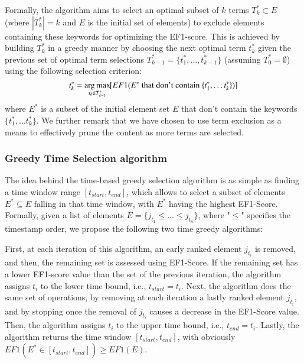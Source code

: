 Formally, the algorithm aims to select an
optimal subset of $k$ terms $T_{k}^{*}\subset E$ (where $|T_{k}^{*}|=k$ and $E$ is the initial set of elements) to exclude elements containing these keywords for optimizing the EF1-score. This is achieved by
building $T_{k}^{*}$ in a greedy manner by choosing the next optimal
term $t_{k}^{*}$ given the previous set of optimal term selections
$T_{k-1}^{*}=\{t_{1}^{*},\ldots,t_{k-1}^{*}\}$ (assuming $T_{0}^{*}=\emptyset$)
using the following selection criterion:
\begin{equation}
t_{k}^{*}=\operatorname*{arg\,max}_{t_{k}\notin T_{k-1}^{*}}\hspace{-0.3mm}[EF1(E^{*} \textrm{ that don't contain } \{t_{1}^{*},\dots t_{k}^{*}\})]
\end{equation}
where  $E^{*}$ is a subset of the initial element set $E$ that don't contain the keywords $\{t_{1}^{*},\dots t_{k}^{*}\}$. 
We further remark that we have chosen to use term exclusion as a means to effectively prune the content as more terms are selected.  

\subsubsection{Greedy Time Selection algorithm}

The idea behind the time-based greedy selection algorithm is as simple as finding a time window range $[t_{start},t_{end}]$, which allows to select a subset of elements $E^{*}\subseteq E$ falling in that time window, with $E^{*}$ having the highest EF1-Score. 
Formally, given a list of elements $E=\{j_{t_1}\leq \dots \leq j_{t_n}\}$, where "$\leq$" specifies the timestamp order, we propose the following two time greedy algorithms:

 First, at each iteration of this algorithm, an early ranked element $j_{t_i}$ is removed, and then, the remaining set is assessed using EF1-Score. If the remaining set has a lower EF1-score value than the set of the previous iteration, the algorithm assigns $t_i$ to the lower time bound, i.e., $t_{start}=t_i$. 
Next, the algorithm does the same set of operations, by removing at each iteration a lastly ranked element  $j_{t_i}$, and by stopping once the removal of  $j_{t_i}$ causes a decrease in the EF1-Score value. Then, the algorithm assigns $t_i$ to the upper time bound, i.e., $t_{end}=t_i$. 
Lastly, the algorithm returns the time window $[t_{start},t_{end}]$, with obviously $EF1(E^{*} \in [t_{start},t_{end}]) \geq EF1(E)$.

